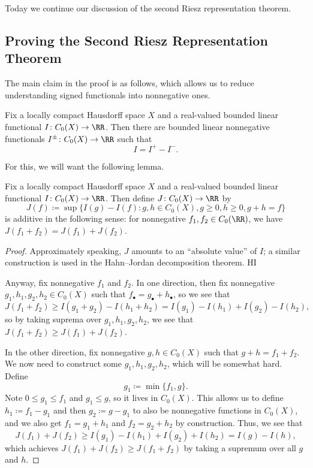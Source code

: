 \documentclass[../notes.tex]{subfiles}
\begin{document}
Today we continue our discussion of the second Riesz representation theorem.

\subsection{Proving the Second Riesz Representation Theorem}
The main claim in the proof is as follows, which allows us to reduce understanding signed functionals into nonnegative ones.
\begin{proposition} \label{prop:decompose-bounded-linear-functional}
	Fix a locally compact Hausdorff space $X$ and a real-valued bounded linear functional $I\colon C_0(X)\to\RR$. Then there are bounded linear nonnegative functionals $I^\pm\colon C_0(X)\to\RR$ such that
	\[I=I^+-I^-.\]
\end{proposition}
For this, we will want the following lemma.
\begin{lemma}
	Fix a locally compact Hausdorff space $X$ and a real-valued bounded linear functional $I\colon C_0(X)\to\RR$. Then define $J\colon C_0(X)\to\RR$ by
	\[J(f)\coloneqq\sup\{I(g)-I(f):g,h\in C_0(X),g\ge0,h\ge0,g+h=f\}\]
	is additive in the following sense: for nonnegative $f_1,f_2\in C_0(\RR)$, we have $J(f_1+f_2)=J(f_1)+J(f_2)$.
\end{lemma}
\begin{proof}
	Approximately speaking, $J$ amounts to an ``absolute value'' of $I$; a similar construction is used in the Hahn--Jordan decomposition theorem. HI

	Anyway, fix nonnegative $f_1$ and $f_2$. In one direction, then fix nonnegative $g_1,h_1,g_2,h_2\in C_0(X)$ such that $f_\bullet=g_\bullet+h_\bullet$, so we see that
	\[J(f_1+f_2)\ge I(g_1+g_2)-I(h_1+h_2)=I(g_1)-I(h_1)+I(g_2)-I(h_2),\]
	so by taking suprema over $g_1,h_1,g_2,h_2$, we see that $J(f_1+f_2)\ge J(f_1)+J(f_2)$.

	In the other direction, fix nonnegative $g,h\in C_0(X)$ such that $g+h=f_1+f_2$. We now need to construct some $g_1,h_1,g_2,h_2$, which will be somewhat hard. Define
	\[g_1\coloneqq\min\{f_1,g\}.\]
	Note $0\le g_1\le f_1$ and $g_1\le g$, so it lives in $C_0(X)$. This allows us to define $h_1\coloneqq f_1-g_1$ and then $g_2\coloneqq g-g_1$ to also be nonnegative functions in $C_0(X)$, and we also get $f_1=g_1+h_1$ and $f_2=g_2+h_2$ by construction. Thus, we see that
	\[J(f_1)+J(f_2)\ge I(g_1)-I(h_1)+I(g_2)+I(h_2)=I(g)-I(h),\]
	which achieves $J(f_1)+J(f_2)\ge J(f_1+f_2)$ by taking a supremum over all $g$ and $h$.
\end{proof}
\end{document}
